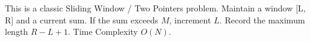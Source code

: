 This is a classic Sliding Window / Two Pointers problem. Maintain a window [L, R] and a current sum. If the sum exceeds $M$, increment $L$. Record the maximum length $R - L + 1$. Time Complexity $O(N)$.